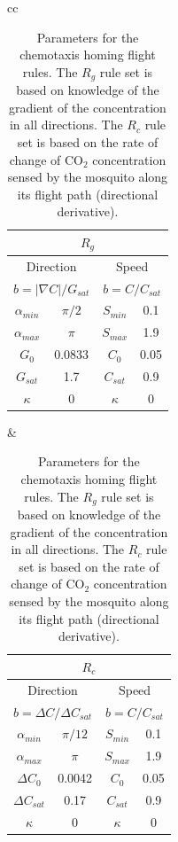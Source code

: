 \documentclass[12pt]{article}
\newcommand{\mycaption}[1]{\caption{#1}}
\begin{document}
\begin{table}[hbt]
	\mycaption{Parameters for the chemotaxis homing flight rules. The $R_g$ rule set is based on knowledge of the gradient of the concentration in all directions. The $R_c$ rule set is based on the rate of change of CO$_2$ concentration sensed by the mosquito along its flight path (directional derivative).  }
	\begin{center}
		\begin{tabular}{cc}
			{\begin{tabular}{|c|c|c|c|}
				\hline
				\multicolumn{4}{|c|}{$R_g$}\\
				\hline
				\multicolumn{2}{|c|}{Direction} & \multicolumn{2}{|c|}{Speed} \\
				\multicolumn{2}{|c|}{$b=|\nabla C|/G_{sat}$} & \multicolumn{2}{|c|}{$b=C/C_{sat}$} \\
				\hline
				$\alpha_{min}$ & $\pi/2$ &    $S_{min}$ & 0.1 \\
				$\alpha_{max}$ & $\pi$ &      $S_{max}$ & 1.9 \\
				$G_0$ & 0.0833 &              $C_0$ & 0.05 \\
				$G_{sat}$ & 1.7 &             $C_{sat}$ & 0.9 \\
			    $\kappa$ & 0 &            	$\kappa$ & 0 \\
				\hline
			\end{tabular}} &
			{\begin{tabular}{|c|c|c|c|}
				\hline
				\multicolumn{4}{|c|}{$R_c$}\\
				\hline
				\multicolumn{2}{|c|}{Direction} & \multicolumn{2}{|c|}{Speed} \\
				\multicolumn{2}{|c|}{$b=\Delta C/\Delta C_{sat}$} & \multicolumn{2}{|c|}{$b=C/C_{sat}$} \\
				\hline
				$\alpha_{min}$ & $\pi/12$ &    $S_{min}$ & 0.1 \\
				$\alpha_{max}$ & $\pi$ &      $S_{max}$ & 1.9 \\
				$\Delta C_0$ & 0.0042 &              $C_0$ & 0.05 \\
				$\Delta C_{sat}$ & 0.17 &             $C_{sat}$ & 0.9 \\
			    $\kappa$ & 0 &            	$\kappa$ & 0 \\
				\hline
			\end{tabular}} 		
	\end{tabular}\label{tab:toyparams1}
	\end{center}
\end{table}
		
\end{document}
